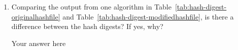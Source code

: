 \documentclass[11pt,letterpaper]{article}
\newenvironment{answer}{\em \color{blue} \begin{adjustwidth}{1cm}{1cm}}{\end{adjustwidth}}
\begin{document}
\begin{enumerate}
		\item Comparing the output from one algorithm in Table~\ref{tab:hash-digest-originalhashfile} and Table~\ref{tab:hash-digest-modifiedhashfile}, is there a difference between the hash digests? If yes, why?
		
		\begin{answer}
			Your answer here
		\end{answer}
		
		
			
			
			
		
	\end{enumerate}
\end{document}
